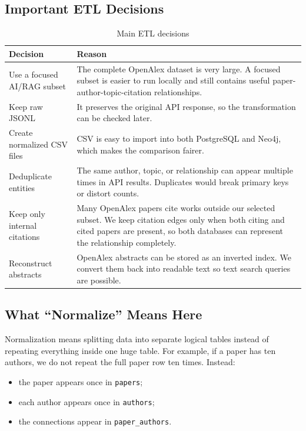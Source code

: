 \documentclass[11pt]{article}
\begin{document}
\subsection{Important ETL Decisions}

\begin{table}[H]
\centering
\small
\begin{tabular}{|p{}|p{}|}
\hline
\textbf{Decision} & \textbf{Reason} \\
\hline
Use a focused AI/RAG subset & The complete OpenAlex dataset is very large. A focused subset is easier to run locally and still contains useful paper-author-topic-citation relationships. \\
\hline
Keep raw JSONL & It preserves the original API response, so the transformation can be checked later. \\
\hline
Create normalized CSV files & CSV is easy to import into both PostgreSQL and Neo4j, which makes the comparison fairer. \\
\hline
Deduplicate entities & The same author, topic, or relationship can appear multiple times in API results. Duplicates would break primary keys or distort counts. \\
\hline
Keep only internal citations & Many OpenAlex papers cite works outside our selected subset. We keep citation edges only when both citing and cited papers are present, so both databases can represent the relationship completely. \\
\hline
Reconstruct abstracts & OpenAlex abstracts can be stored as an inverted index. We convert them back into readable text so text search queries are possible. \\
\hline
\end{tabular}
\caption{Main ETL decisions}
\end{table}

\subsection{What ``Normalize'' Means Here}

Normalization means splitting data into separate logical tables instead of repeating everything inside one huge table.
For example, if a paper has ten authors, we do not repeat the full paper row ten times.
Instead:

\begin{itemize}
    \item the paper appears once in \texttt{papers};
    \item each author appears once in \texttt{authors};
    \item the connections appear in \texttt{paper\_authors}.
\end{itemize}
\end{document}
